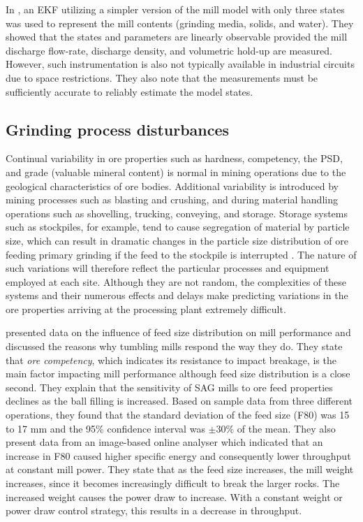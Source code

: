 In \cite{le_roux_ekf_2017}, an \gls{EKF} utilizing a simpler version of the mill model with only three states was used to represent the mill contents (grinding media, solids, and water). They showed that the states and parameters are linearly observable provided the mill discharge flow-rate, discharge density, and volumetric hold-up are measured. However, such instrumentation is also not typically available in industrial circuits due to space restrictions. They also note that the measurements must be sufficiently accurate to reliably estimate the model states.

\subsection{Grinding process disturbances}

Continual variability in ore properties such as hardness, competency, the \gls{PSD}, and grade (valuable mineral content) is normal in mining operations due to the geological characteristics of ore bodies. Additional variability is introduced by mining processes such as blasting and crushing, and during material handling operations such as shovelling, trucking, conveying, and storage. Storage systems such as stockpiles, for example, tend to cause segregation of material by particle size, which can result in dramatic changes in the particle size distribution of ore feeding primary grinding if the feed to the stockpile is interrupted \citep{estrada_hybrid_2014}. The nature of such variations will therefore reflect the particular processes and equipment employed at each site. Although they are not random, the complexities of these systems and their numerous effects and delays make predicting variations in the ore properties arriving at the processing plant extremely difficult.

\cite{morrell_influence_2001} presented data on the influence of feed size distribution on mill performance and discussed the reasons why tumbling mills respond the way they do. They state that \textit{ore competency}, which indicates its resistance to impact breakage, is the main factor impacting mill performance although feed size distribution is a close second. They explain that the sensitivity of \acrshort{SAG} mills to ore feed properties declines as the ball filling is increased. Based on sample data from three different operations, they found that the standard deviation of the feed size (F80) was 15 to 17 mm and the 95\% confidence interval was $\pm30\text{\%}$ of the mean. They also present data from an image-based online analyser which indicated that an increase in F80 caused higher specific energy and consequently lower throughput at constant mill power. They state that as the feed size increases, the mill weight increases, since it becomes increasingly difficult to break the larger rocks. The increased weight causes the power draw to increase. With a constant weight or power draw control strategy, this results in a decrease in throughput.

